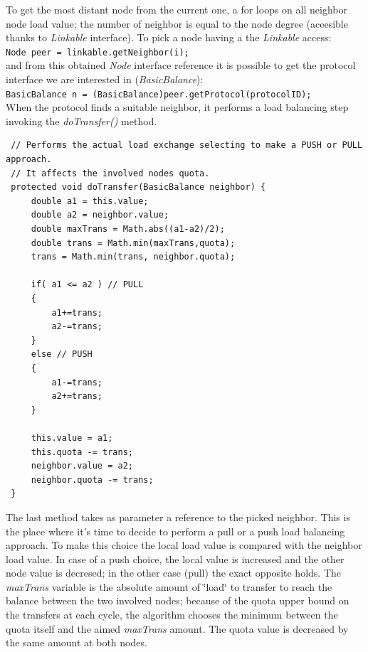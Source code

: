 \documentclass[a4paper,11pt]{article}
\begin{document}
To get the most distant node from the current one, a for loops on
all neighbor node load value; the number of neighbor is equal to the
node degree (aceesible thanks to \emph{Linkable} interface). To pick
a node having a the \emph{Linkable} access:\\


\texttt{\footnotesize Node peer = linkable.getNeighbor(i);} \\


and from this obtained \emph{Node} interface reference it is possible
to get the protocol interface we are interested in (\emph{BasicBalance}):\\


\texttt{\footnotesize BasicBalance n = (BasicBalance)peer.getProtocol(protocolID);}
\\


When the protocol finds a suitable neighbor, it performs a load balancing
step invoking the \emph{doTransfer()} method.\\

\footnotesize
\begin{verbatim}
 // Performs the actual load exchange selecting to make a PUSH or PULL approach.
 // It affects the involved nodes quota. 
 protected void doTransfer(BasicBalance neighbor) {
     double a1 = this.value;
     double a2 = neighbor.value;
     double maxTrans = Math.abs((a1-a2)/2);
     double trans = Math.min(maxTrans,quota);
     trans = Math.min(trans, neighbor.quota);
 
     if( a1 <= a2 ) // PULL
     {
         a1+=trans;
         a2-=trans;
     }
     else // PUSH
     {
         a1-=trans;
         a2+=trans;
     }
     
     this.value = a1;
     this.quota -= trans;
     neighbor.value = a2;
     neighbor.quota -= trans; 
 }
\end{verbatim}
\normalsize


The last method takes as parameter a reference to the picked neighbor.
This is the place where it's time to decide to perform a pull or a
push load balancing approach. To make this choice the local load value
is compared with the neighbor load value. In case of a push choice,
the local value is increased and the other node value is decresed;
in the other case (pull) the exact opposite holds. The \emph{maxTrans}
variable is the absolute amount of \char`\"{}load\char`\"{} to transfer
to reach the balance between the two involved nodes; because of the
quota upper bound on the transfers at each cycle, the algorithm chooses
the minimum between the quota itself and the aimed \emph{maxTrans}
amount. The quota value is decreased by the same amount at both nodes.
\end{document}
